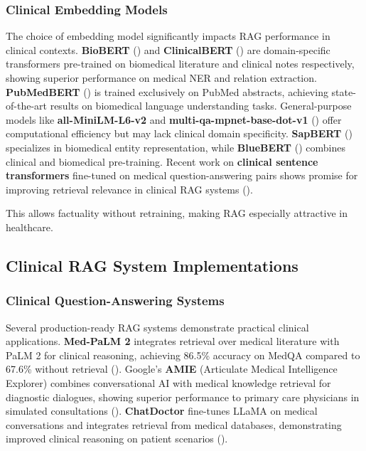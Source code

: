\subsubsection{Clinical Embedding Models}
The choice of embedding model significantly impacts RAG performance in clinical contexts. \textbf{BioBERT} (\citep{lee2020biobert}) and \textbf{ClinicalBERT} (\citep{alsentzer2019clinicalbert}) are domain-specific transformers pre-trained on biomedical literature and clinical notes respectively, showing superior performance on medical NER and relation extraction. \textbf{PubMedBERT} (\citep{gu2021pubmedbert}) is trained exclusively on PubMed abstracts, achieving state-of-the-art results on biomedical language understanding tasks. General-purpose models like \textbf{all-MiniLM-L6-v2} and \textbf{multi-qa-mpnet-base-dot-v1} (\citep{reimers2019sentencebert}) offer computational efficiency but may lack clinical domain specificity. \textbf{SapBERT} (\citep{liu2021sapbert}) specializes in biomedical entity representation, while \textbf{BlueBERT} (\citep{peng2019bluebert}) combines clinical and biomedical pre-training. Recent work on \textbf{clinical sentence transformers} fine-tuned on medical question-answering pairs shows promise for improving retrieval relevance in clinical RAG systems (\citep{zhang2023clinical}).

This allows factuality without retraining, making RAG especially attractive in healthcare.

\subsection{Clinical RAG System Implementations}

\subsubsection{Clinical Question-Answering Systems}
Several production-ready RAG systems demonstrate practical clinical applications. \textbf{Med-PaLM 2} integrates retrieval over medical literature with PaLM 2 for clinical reasoning, achieving 86.5\% accuracy on MedQA compared to 67.6\% without retrieval (\citep{singhal2023medpalm2}). Google's \textbf{AMIE} (Articulate Medical Intelligence Explorer) combines conversational AI with medical knowledge retrieval for diagnostic dialogues, showing superior performance to primary care physicians in simulated consultations (\citep{tu2024amie}). \textbf{ChatDoctor} fine-tunes LLaMA on medical conversations and integrates retrieval from medical databases, demonstrating improved clinical reasoning on patient scenarios (\citep{li2023chatdoctor}).

